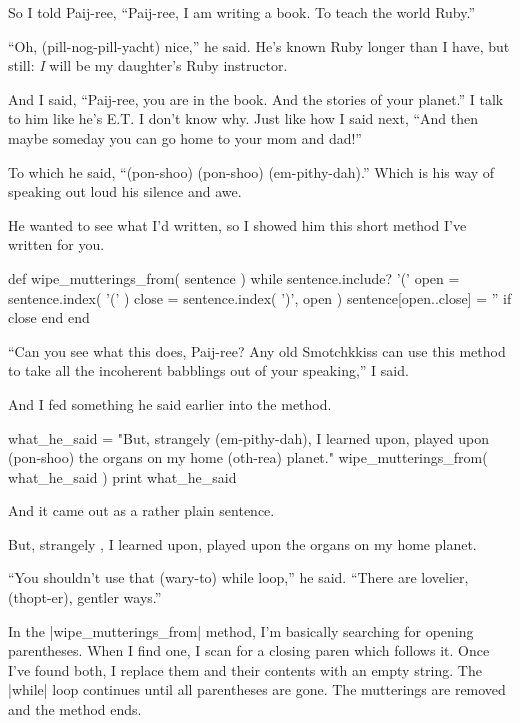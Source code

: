 \documentclass[12pt,twoside]{report}
\begin{document}
So I told Paij-ree, ``Paij-ree, I am writing a book.  To teach the
world Ruby.''

``Oh, (pill-nog-pill-yacht) nice,'' he said.  He's known Ruby longer
than I have, but still: {\em I} will be my daughter's Ruby instructor.

And I said, ``Paij-ree, you are in the book.  And the stories of your
planet.''  I talk to him like he's E.T.  I don't know why.  Just like
how I said next, ``And then maybe someday you can go home to your mom
and dad!''

To which he said, ``(pon-shoo) (pon-shoo) (em-pithy-dah).''  Which is
his way of speaking out loud his silence and awe.

He wanted to see what I'd written, so I showed him this short method
I've written for you.


\begin{rubycode}

 def wipe_mutterings_from( sentence )
   while sentence.include? '('
     open = sentence.index( '(' )
     close = sentence.index( ')', open )
     sentence[open..close] = '' if close
   end
 end

\end{rubycode}


``Can you see what this does, Paij-ree?  Any old Smotchkkiss can use
this method to take all the incoherent babblings out of your
speaking,'' I said.

And I fed something he said earlier into the method.


\begin{rubycode}

 what_he_said = "But, strangely (em-pithy-dah),
   I learned upon, played upon (pon-shoo) the
   organs on my home (oth-rea) planet."
 wipe_mutterings_from( what_he_said )
 print what_he_said

\end{rubycode}


And it came out as a rather plain sentence.


\begin{consolecode}

 But, strangely ,
 I learned upon, played upon the
 organs on my home planet.

\end{consolecode}


``You shouldn't use that (wary-to) while loop,'' he said.  ``There are
lovelier, (thopt-er), gentler ways.''

In the \rubyinline|wipe_mutterings_from| method, I'm
basically searching for opening parentheses.  When I find one, I scan
for a closing paren which follows it.  Once I've found both, I replace
them and their contents with an empty string.  The
\rubyinline|while| loop continues until all
parentheses are gone. The mutterings are removed and the method ends.
\end{document}
